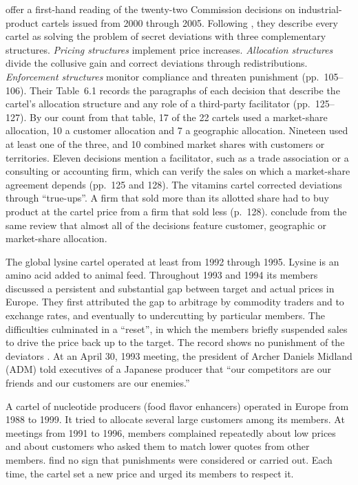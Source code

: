 \citet[ch.~6]{MarshallMarx2012} offer a first-hand reading of the twenty-two Commission decisions on
industrial-product cartels issued from 2000 through 2005. Following \citet{Stigler1964}, they describe every cartel
as solving the problem of secret deviations with three complementary structures. \emph{Pricing structures} implement price increases. \emph{Allocation structures}
divide the collusive gain and correct deviations through redistributions. \emph{Enforcement structures} monitor
compliance and threaten punishment (pp.~105--106). Their Table~6.1 records the paragraphs of each decision that
describe the cartel's allocation structure and any role of a third-party facilitator (pp.~125--127). By our count
from that table, 17 of the 22 cartels used a market-share allocation, 10 a customer allocation and 7 a geographic
allocation. Nineteen used at least one of the three, and 10 combined market shares with customers or territories.
Eleven decisions mention a facilitator, such as a trade association or a consulting or accounting firm, which can
verify the sales on which a market-share agreement depends (pp.~125 and 128). The vitamins cartel corrected
deviations through ``true-ups''. A firm that sold more than its allotted share had to buy product at the cartel
price from a firm that sold less (p.~128). \citet[p.~198, note~53]{AskerNocke2021} conclude from the same review
that almost all of the decisions feature customer, geographic or market-share allocation.

The global lysine cartel operated at least from 1992 through 1995. Lysine is an amino acid added to animal
feed. Throughout 1993 and 1994 its members discussed a persistent and substantial gap between target and
actual prices in Europe. They first attributed the gap to arbitrage by commodity traders and to exchange
rates, and eventually to undercutting by particular members. The difficulties culminated in a ``reset'', in
which the members briefly suspended sales to drive the price back up to the target. The record shows no
punishment of the deviators \citep[pp.~2--3]{BernheimMadsen2017}. At an April 30, 1993 meeting, the president
of Archer Daniels Midland (ADM) told executives of a Japanese producer that ``our competitors are our friends
and our customers are our enemies.''

A cartel of nucleotide producers (food flavor enhancers) operated in Europe from 1988 to 1999. It tried to
allocate several large customers among its members. At meetings from 1991 to 1996, members complained
repeatedly about low prices and about customers who asked them to match lower quotes from other members.
\citet[p.~3]{BernheimMadsen2017} find no sign that punishments were considered or carried out. Each time, the
cartel set a new price and urged its members to respect it.

